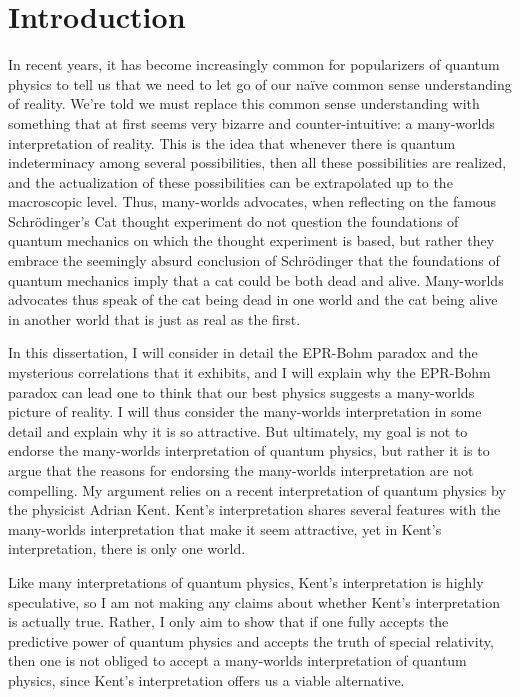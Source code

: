 \chapter*{Introduction}
In recent years, it has become increasingly common for popularizers of quantum physics to tell us that we need to let go of our naïve common sense understanding of reality. We're told we must replace this common sense understanding with something that at first seems very bizarre and counter-intuitive: a many-worlds interpretation of reality. This is the idea that whenever there is quantum indeterminacy among several possibilities, then all these possibilities are realized, and the actualization of these possibilities can be extrapolated up to the macroscopic level. Thus, many-worlds advocates, when reflecting on the famous Schr\"{o}dinger's Cat thought experiment do not question the foundations of quantum mechanics on which the thought experiment is based, but rather they embrace the seemingly absurd conclusion of Schr\"{o}dinger that the foundations of quantum mechanics imply that a cat could be both dead and alive. Many-worlds advocates thus speak of the cat being dead in one world and the cat being alive in another world that is just as real as the first. 

In this dissertation, I will consider in detail the EPR-Bohm paradox and the mysterious correlations that it exhibits, and I will explain why the EPR-Bohm paradox can lead one to think that our best physics suggests a many-worlds picture of reality. I will thus consider the many-worlds interpretation in some detail and explain why it is so attractive. But ultimately, my goal is not to endorse the many-worlds interpretation of quantum physics, but rather it is to argue that the reasons for endorsing the many-worlds interpretation are not compelling. My argument relies on a recent interpretation of quantum physics by the physicist Adrian Kent. Kent's interpretation shares several features with the many-worlds interpretation that make it seem attractive, yet in Kent's interpretation, there is only one world.  

Like many interpretations of quantum physics, Kent's interpretation is highly speculative, so I am not making any claims about whether Kent's interpretation is actually true. Rather, I only aim to show that if one fully accepts the predictive power of quantum physics and accepts the truth of special relativity, then one is not obliged to accept a many-worlds interpretation of quantum physics, since Kent's interpretation offers us a viable alternative.

